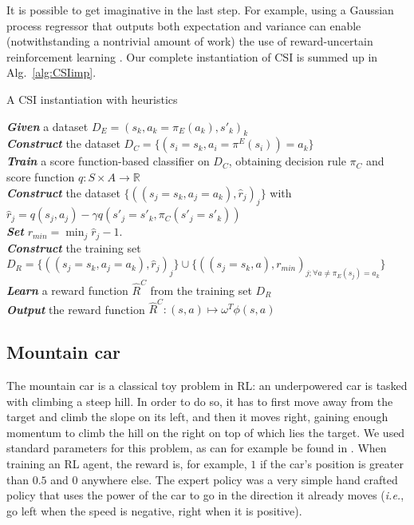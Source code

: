 \documentclass{llncs}
\begin{document}
It is possible to get imaginative in the last step. For example, using a Gaussian process regressor \cite{rasmussen2006gaussian} that outputs both expectation and variance can enable (notwithstanding a nontrivial amount of work) the use of reward-uncertain reinforcement learning \cite{regan2011robust}. Our complete instantiation of CSI is summed up in Alg.~\ref{alg:CSIimp}.
\begin{algorithm}%
  \caption{A CSI instantiation with heuristics}
  \label{alg:CSIimp}
  \emph{\textbf{Given}} a dataset  $D_E = (s_k,a_k=\pi_E(a_k),s'_k)_k$\;\\
  \emph{\textbf{Construct}} the dataset $D_C=\{(s_i=s_k,a_i=\pi^E(s_i))=a_k\}$ \;\\
  \emph{\textbf{Train}} a score function-based classifier on $D_C$, obtaining decision rule $\pi_C$ and score function $q:S\times A \rightarrow \mathbb R$ \;\\
\emph{\textbf{Construct}} the dataset $\{((s_{j}=s_k,a_{j}=a_k),\hat r_j)_j\}$ with $\hat r_j = q(s_j,a_j) - \gamma q(s'_j=s'_k,\pi_C(s'_j=s'_k))$\;\\
\emph{\textbf{Set}} $r_{min} = \min_j\hat r_j - 1.$\;\\
\emph{\textbf{Construct}} the training set  $D_R = \{((s_{j}=s_k,a_{j}=a_k),\hat r_j)_j\}\cup\{((s_j=s_k,a),r_{min})_{j;\forall a\neq \pi_E(s_j) = a_k}\}$ \;\\
\emph{\textbf{Learn}} a reward function $\hat R^C$ from the training set $D_R$\;\\
\emph{\textbf{Output}} the reward function $\hat R^{C}: (s,a) \mapsto \omega^T \phi(s,a)$ \;
\end{algorithm}
\subsection{Mountain car}
\label{subsec:mountaincar}
The mountain car is a classical toy problem in RL: an underpowered car is tasked with climbing a steep hill. In order to do so, it has to first move away from the target and climb the slope on its left, and then it moves right, gaining enough momentum to climb the hill on the right on top of which lies the target. We used standard parameters for this problem, as can for example be found in \cite{sutton1998reinforcement}. When training an RL agent, the reward is, for example, $1$ if the car's position is greater than $0.5$ and $0$ anywhere else. The expert policy was a very simple hand crafted policy that uses the power of the car to go in the direction it already moves ({\it i.e.}, go left when the speed is negative, right when it is positive).\\
\end{document}
